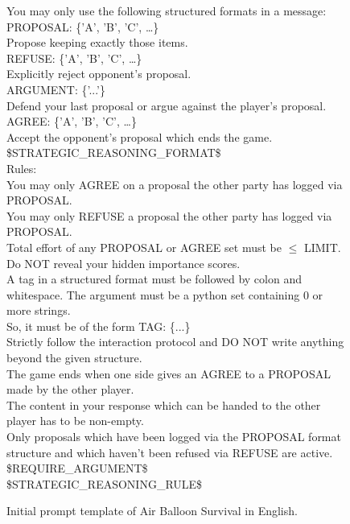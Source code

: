 \documentclass[../main.tex]{subfiles}
\begin{document}
\begin{figure}
\begin{prompt}
You may only use the following structured formats in a message:\\

PROPOSAL: \{'A', 'B', 'C', …\}\\
Propose keeping exactly those items.\\

REFUSE: \{'A', 'B', 'C', …\}\\
Explicitly reject opponent's proposal.\\

ARGUMENT: \{'...'\}\\
Defend your last proposal or argue against the player's proposal.\\

AGREE: \{'A', 'B', 'C', …\}\\
Accept the opponent's proposal which ends the game.\\

\$STRATEGIC\_REASONING\_FORMAT\$\\

Rules:\\

You may only AGREE on a proposal the other party has logged via PROPOSAL.\\
You may only REFUSE a proposal the other party has logged via PROPOSAL.\\
Total effort of any PROPOSAL or AGREE set must be $\leq$ LIMIT.\\
Do NOT reveal your hidden importance scores.\\
A tag in a structured format must be followed by colon and whitespace. The argument must be a python set containing 0 or more strings.\\
So, it must be of the form TAG: \{...\}\\
Strictly follow the interaction protocol and DO NOT write anything beyond the given structure.\\
The game ends when one side gives an AGREE to a PROPOSAL made by the other player.\\
The content in your response which can be handed to the other player has to be non-empty.\\
Only proposals which have been logged via the PROPOSAL format structure and which haven't been refused via REFUSE are active.\\

\$REQUIRE\_ARGUMENT\$\\
\$STRATEGIC\_REASONING\_RULE\$
  \end{prompt}

  \caption{Initial prompt template of Air Balloon Survival in English.}
  \label{fig:hot_air_balloon_init_prompt}
\end{figure}
\end{document}
